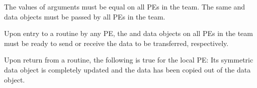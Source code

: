 \begin{apidefinition}
{    The values of arguments  must be equal on all \acp{PE}
    in the team.
    The same \dest{} and \source{} data objects must be passed by
    all \acp{PE} in the team.

    Upon entry to a  routine by any \ac{PE}, the
    \source{} and \dest{} data objects on all \acp{PE} in the team must
    be ready to send or receive the data to be transferred, respectively.

    Upon return from a  routine, the following
    is true for the local PE:
    Its \dest{} symmetric data object is completely updated and the data
    has been copied out of the \source{} data object.
}




\end{apidefinition}

